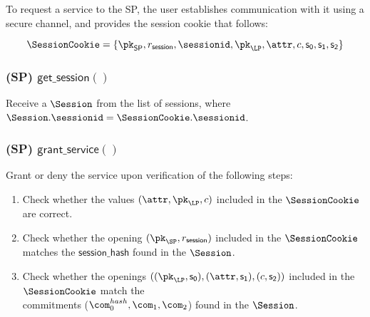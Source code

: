 To request a service to the SP, the user establishes communication with it using a secure channel, and provides the session cookie that follows:

$$\SessionCookie = \{\pk_{\mathsf{SP}}, r_\mathsf{session}, \sessionid, \pk_{\LP}, \attr, c, \mathsf{s_0}, \mathsf{s_1}, \mathsf{s_2}\}$$


\subsubsection{(\textbf{SP}) $\mathsf{get\_session()}$}

Receive a $\Session$ from the list of sessions, where $\Session.\sessionid = \SessionCookie.\sessionid$.


\subsubsection{(\textbf{SP}) $\mathsf{grant\_service()}$}

Grant or deny the service upon verification of the following steps:

\begin{enumerate}
	\item Check whether the values $(\attr, \pk_{\LP}, c)$ included in the $\SessionCookie$ are correct.
	\item Check whether the opening $(\pk_{\SP}, r_\mathsf{session})$ included in the $\SessionCookie$ matches the $\mathsf{session\_hash}$ found in the $\Session$.
	\item Check whether the openings $((\pk_{\LP}, \mathsf{s_0}), (\attr, \mathsf{s_1}), (c, \mathsf{s_2}))$ included in the $\SessionCookie$ match the\\
	commitments ($\com_0^{hash}, \com_1, \com_2$) found in the $\Session$.
\end{enumerate}


